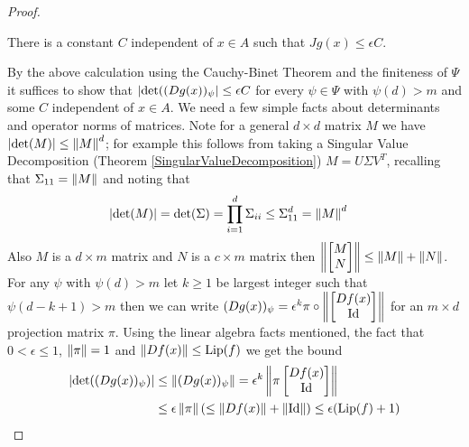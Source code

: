 \begin{proof}
\begin{clm}There is a constant $C$ independent of $x \in A$ such that $Jg(x) \leq \epsilon C$.
\end{clm}
By the above calculation using the Cauchy-Binet Theorem and the finiteness of $\Psi$ it suffices to show that $\left \vert \det((Dg(x))_\psi \right \vert  \leq \epsilon C$ for every $\psi \in \Psi$ with $\psi(d)>m$
and some $C$ independent of $x \in A$.   We need a few simple facts about determinants and operator norms of matrices. Note for a general $d \times d$ matrix $M$ we have $\left \vert \det(M) \right \vert \leq \left \lVert M \right \rVert^d$; for example this follows from taking a Singular Value Decomposition (Theorem \ref{SingularValueDecomposition}) $M = U \Sigma V^T$, recalling that $\Sigma_{11} = \left \lVert M \right \rVert$ and noting that 
\begin{align*}
\left \vert \det(M) \right \vert &= \det(\Sigma) = \prod_{i=1}^d \Sigma_{ii} \leq \Sigma_{11}^d = \left \lVert M \right \rVert^d
\end{align*}
Also $M$ is a $d \times m$ matrix and $N$ is a $c \times m$ matrix then $\left \lVert \begin{bmatrix} M \\ N \end{bmatrix} \right \rVert \leq \left \lVert M \right \rVert + \left \lVert N \right \rVert$.
For any $\psi$ with $\psi(d) > m$ let $k \geq 1$ be largest integer such that $\psi(d-k+1) > m$ then we can write $(Dg(x))_\psi = \epsilon^k \pi \circ \left \lVert \begin{bmatrix} Df(x) \\ \operatorname*{Id}\end{bmatrix} \right \rVert$ for an $m \times d$ projection matrix $\pi$.  Using the linear algebra facts mentioned, the fact that $0 < \epsilon \leq 1$, $\left \lVert \pi \right \rVert =1$ and $\left \lVert Df(x) \right \rVert \leq \operatorname*{Lip}(f)$ we get the bound
\begin{align*}
\left \vert \det((Dg(x))_\psi) \right \vert &\leq \left \lVert (Dg(x))_\psi \right \rVert = \epsilon^{k} \left \lVert \pi \begin{bmatrix} Df(x) \\ \operatorname*{Id}\end{bmatrix} \right \rVert \\
&\leq \epsilon \left \lVert \pi \right \rVert ( \leq \left \lVert Df(x) \right \rVert + \left \lVert \operatorname*{Id} \right \rVert ) \leq \epsilon(\operatorname*{Lip}(f) + 1)
\end{align*}


\end{proof}
